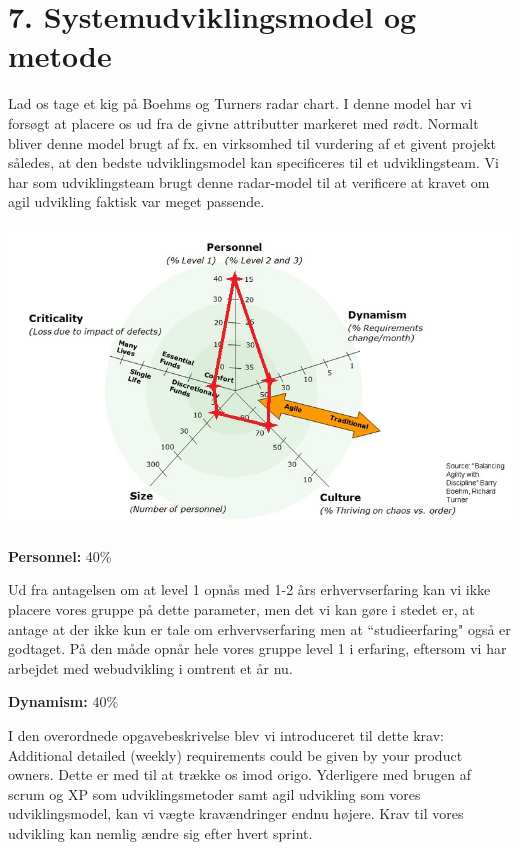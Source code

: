 \documentclass[11pt]{report}
\begin{document}
\chapter*{7. Systemudviklingsmodel og metode}

Lad os tage et kig på Boehms og Turners radar chart. I denne model har vi forsøgt at placere os ud fra de givne attributter markeret med rødt. Normalt bliver denne model brugt af fx. en virksomhed til vurdering af et givent projekt således, at den bedste udviklingsmodel kan specificeres til et udviklingsteam. Vi har som udviklingsteam brugt denne radar-model til at verificere at kravet om agil udvikling faktisk var meget passende.

\begin{center}
\includegraphics[height=8cm, width=15cm]{RadarChartPaint.jpg}
\end{center}

\noindent\textbf{Personnel:} 40\%

Ud fra antagelsen om at level 1 opnås med 1-2 års erhvervserfaring kan vi ikke placere vores gruppe på dette parameter, men det vi kan gøre i stedet er, at antage at der ikke kun er tale om erhvervserfaring men at “studieerfaring" også er godtaget. På den måde opnår hele vores gruppe level 1 i erfaring, eftersom vi har arbejdet med webudvikling i omtrent et år nu.

\newpage
\noindent\textbf{Dynamism:} 40\%

I den overordnede opgavebeskrivelse blev vi introduceret til dette krav: Additional detailed (weekly) requirements could be given by your product owners. Dette er med til at trække os imod origo. Yderligere med brugen af scrum og XP som udviklingsmetoder samt agil udvikling som vores udviklingsmodel, kan vi vægte kravændringer endnu højere. Krav til vores udvikling kan nemlig ændre sig efter hvert sprint.
\end{document}
